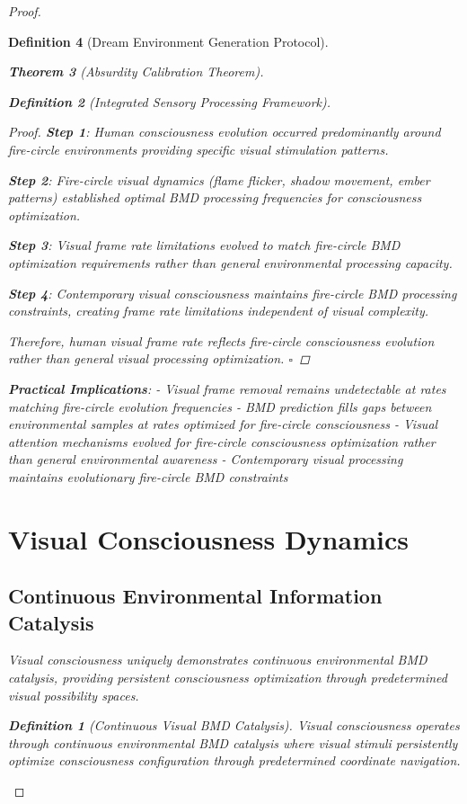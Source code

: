 \documentclass[12pt,a4paper]{article}
\newtheorem{theorem}{Theorem}[section]
\newtheorem{definition}[theorem]{Definition}
\begin{document}
\begin{proof}
\begin{definition}[Dream Environment Generation Protocol]
\begin{theorem}[Absurdity Calibration Theorem]
\begin{observation}
\begin{definition}[Integrated Sensory Processing Framework]
\begin{proof}
\textbf{Step 1}: Human consciousness evolution occurred predominantly around fire-circle environments providing specific visual stimulation patterns.

\textbf{Step 2}: Fire-circle visual dynamics (flame flicker, shadow movement, ember patterns) established optimal BMD processing frequencies for consciousness optimization.

\textbf{Step 3}: Visual frame rate limitations evolved to match fire-circle BMD optimization requirements rather than general environmental processing capacity.

\textbf{Step 4}: Contemporary visual consciousness maintains fire-circle BMD processing constraints, creating frame rate limitations independent of visual complexity.

Therefore, human visual frame rate reflects fire-circle consciousness evolution rather than general visual processing optimization. $\square$
\end{proof}

\textbf{Practical Implications}:
- Visual frame removal remains undetectable at rates matching fire-circle evolution frequencies
- BMD prediction fills gaps between environmental samples at rates optimized for fire-circle consciousness
- Visual attention mechanisms evolved for fire-circle consciousness optimization rather than general environmental awareness
- Contemporary visual processing maintains evolutionary fire-circle BMD constraints

\section{Visual Consciousness Dynamics}

\subsection{Continuous Environmental Information Catalysis}

Visual consciousness uniquely demonstrates continuous environmental BMD catalysis, providing persistent consciousness optimization through predetermined visual possibility spaces.

\begin{definition}[Continuous Visual BMD Catalysis]
Visual consciousness operates through continuous environmental BMD catalysis where visual stimuli persistently optimize consciousness configuration through predetermined coordinate navigation.
\end{definition}


\end{definition}
\end{observation}
\end{theorem}
\end{definition}
\end{proof}
\end{document}

